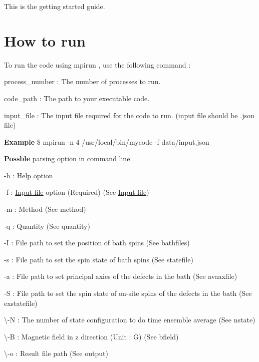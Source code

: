 This is the getting started guide.\hypertarget{GettingStarted_HowToRun}{}\section{How to run}\label{GettingStarted_HowToRun}
To run the code using {\ttfamily  mpirun }, use the following command \-:





\begin{DoxyItemize}
\item process\-\_\-number \-: The number of processes to run.
\item code\-\_\-path \-: The path to your executable code.
\item input\-\_\-file \-: The input file required for the code to run. (input file should be {\ttfamily .json} file)
\end{DoxyItemize}

{\bfseries Example} {\bfseries }  \$ mpirun -\/n 4 /usr/local/bin/mycode -\/f data/input.\-json 

{\bfseries Possble} parsing option in command line {\bfseries } 


\begin{DoxyItemize}
\item -\/h \-: Help option
\item -\/f \-: \hyperlink{InputFile}{Input file} option (Required) (See \hyperlink{InputFile}{Input file})
\item -\/m \-: Method (See method)
\item -\/q \-: Quantity (See quantity)
\item -\/\-I \-: File path to set the position of bath spins (See bathfiles)
\item -\/s \-: File path to set the spin state of bath spins (See statefile)
\item -\/a \-: File path to set principal axies of the defects in the bath (See avaaxfile)
\item -\/\-S \-: File path to set the spin state of on-\/site spins of the defects in the bath (See exstatefile)
\item \textbackslash{}-\/\-N \-: The number of state configuration to do time ensemble average (See nstate)
\item \textbackslash{}-\/\-B \-: Magnetic field in z direction (Unit \-: G) (See bfield)
\item \textbackslash{}-\/o \-: Result file path (See output) 
\end{DoxyItemize}